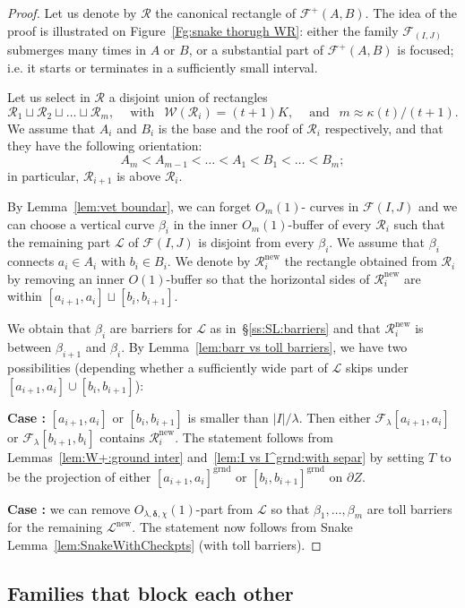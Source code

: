 \documentclass{amsart}
\renewcommand{\sp}{{\ \ }}
\newcommand{\1}{{\mathbb 1 }}
\newcommand{\Fam}{{\mathcal F}}
\newcommand{\Width}{{\mathcal W}}
\newcommand\LL{{\mathcal L}}
\newcommand\RR{\mathcal{R}}
\newcommand{\grnd}{{\operatorname{grnd}}}
\newcommand\new{{\operatorname{new}}}
\theoremstyle{remark}
\numberwithin{equation}{section}
\theoremstyle{definition}
\newcommand{\bdelta}{{\boldsymbol{ \delta}}}
\newcommand{\RN}[1]{\MakeUppercase{\romannumeral#1}}%
\begin{document}
\begin{proof}
Let us denote by $\RR$ the canonical rectangle of $\Fam^+(A,B)$. The idea of the proof is illustrated on Figure~\ref{Fg:snake thorugh WR}: either the family $\Fam_(I,J)$ submerges many times in $A$ or $B$, or a substantial part of $\Fam^+(A,B)$ is focused; i.e. it starts or terminates in a sufficiently small interval.

Let us select in $\RR$ a disjoint union of rectangles \[\RR_1\sqcup \RR_2\sqcup \dots\sqcup \RR_m,\sp\sp\text{ with }\sp \Width(\RR_i) = (t+1) K,\sp\sp \text{ and }\sp m \approx  \kappa(t)/(t+1).\] We assume that $A_i$ and $B_i$ is the base and the roof of $\RR_i$ respectively, and that they have the following orientation:
\[ A_{m}<A_{m-1}<\dots <A_1<B_1<\dots <B_m;\]
in particular, $\RR_{i+1}$ is above $\RR_i$.

By Lemma~\ref{lem:vet boundar}, we can forget $O_m(1)$- curves in $\Fam(I,J)$ and we can choose a vertical curve $\beta_i$ in the inner $O_m(1)$-buffer of every $\RR_i$ such that the remaining part $\LL$ of $\Fam(I,J)$ is disjoint from every $\beta_i$. We assume that $\beta_i$ connects $a_i\in A_i$ with $b_i\in B_i$. We denote by $\RR^\new_i$ the rectangle obtained from $\RR_i$ by removing an inner $O(1)$-buffer so that the horizontal sides of $\RR^\new_i$ are within $[a_{i+1},a_i]\sqcup [b_i,b_{i+1}]$.

We obtain that $\beta_i$ are barriers for $\LL$ as in~\S\ref{ss:SL:barriers} and that $\RR^\new_i$ is between $\beta_{i+1}$ and $\beta_i$. By Lemma~\ref{lem:barr vs toll barriers}, we have two possibilities (depending whether a sufficiently wide part of $\LL$ skips under $[a_{i+1},a_i]\cup [b_i,b_{i+1}]$):

{\bf Case \RN{1}:} $[a_{i+1},a_i]$ or $[b_i,b_{i+1}]$ is smaller than $|I|/\lambda$. Then either $\Fam_{\lambda} [a_{i+1},a_i]$ or $\Fam_{\lambda} [b_{i+1},b_i]$ contains $\RR^\new_i$. The statement follows from Lemmas~\ref{lem:W+:ground inter} and~\ref{lem:I vs I^grnd:with separ} by setting $T$ to be the projection of either $[a_{i+1},a_i]^\grnd$ or $[b_i,b_{i+1}]^\grnd$ on $\partial Z$. 

{\bf Case \RN{2}:} we can remove $O_{\lambda,\bdelta,\chi}(1)$-part from $\LL$ so that $\beta_{1},\dots, \beta_{m}$ are toll barriers for the remaining $\LL^\new$.  The statement now follows from Snake Lemma~\ref{lem:SnakeWithCheckpts} (with toll barriers).
\end{proof}


\subsection{Families that block each other}
\end{document}
